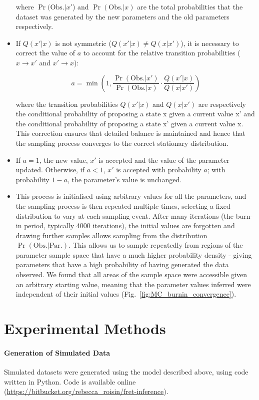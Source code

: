 \begin{itemize}
where $\Pr(\text{Obs.} | x'$) and $\Pr(\text{Obs.} | x)$ are the total probabilities that the dataset was generated by the new parameters and the old parameters respectively.

\item If $Q(x'|x)$ is not symmetric ($Q(x'|x) \neq Q(x|x')$), it is necessary to correct the value of $a$ to account for the relative transition probabilities ($x \rightarrow x'$ and $x' \rightarrow x$): 

\begin{equation}
a = \min(1, \frac{\Pr(\text{Obs.} | x')}{\Pr(\text{Obs.} | x)} \cdot \frac{Q(x' | x)}{Q(x | x')})
\end {equation}

where the transition probabilities  $Q(x' | x)$ and $Q(x | x')$ are respectively the conditional probability of proposing a state x given a current value x' and the conditional probability of proposing a state x' given a current value x. This correction ensures that detailed balance is maintained and hence that the sampling process converges to the correct stationary distribution.

\item  If $a = 1$, the new value, $x'$ is accepted and the value of the parameter updated.  Otherwise, if $a < 1$, $x'$ is accepted with probability $a$; with probability $1 - a$, the parameter's value is unchanged.
\item This process is initialised using arbitrary values for all the parameters, and the sampling process is then repeated multiple times, selecting a fixed distribution to vary at each sampling event. After many iterations (the burn-in period, typically 4000 iterations), the initial values are forgotten and drawing further samples allows sampling from the distribution $\Pr(\text{Obs.} | \text{Par.})$.  This allows us to sample repeatedly from regions of the parameter sample space that have a much higher probability density - giving parameters that have a high probability of having generated the data observed. We found that all areas of the sample space were accessible given an arbitrary starting value, meaning that the parameter values inferred were independent of their initial values (Fig.~\ref{fig:MC_burnin_convergence}).
\end{itemize}


\section{Experimental Methods}
\paragraph*{Generation of Simulated Data}
Simulated datasets were generated using the model described above, using code written in Python. Code is available online (\url{https://bitbucket.org/rebecca_roisin/fret-inference}). 

